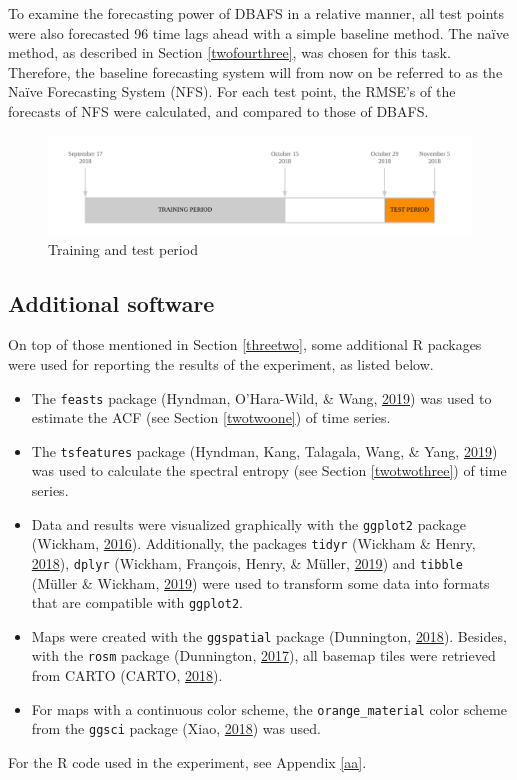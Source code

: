 \documentclass[12pt,oneside]{reedthesis}
\providecommand{\tightlist}{%
  \setlength{\itemsep}{0pt}\setlength{\parskip}{0pt}}
\begin{document}
To examine the forecasting power of DBAFS in a relative manner, all test
points were also forecasted 96 time lags ahead with a simple baseline
method. The naïve method, as described in Section \ref{twofourthree},
was chosen for this task. Therefore, the baseline forecasting system
will from now on be referred to as the Naïve Forecasting System (NFS).
For each test point, the RMSE's of the forecasts of NFS were calculated,
and compared to those of DBAFS.
\begin{figure}[h]
\includegraphics[width=\textwidth]{Figures/traintest} \caption{Training and test period}\label{fig:traintest}
\end{figure}
\subsection{Additional software}\label{additional-software}

On top of those mentioned in Section \ref{threetwo}, some additional R
packages were used for reporting the results of the experiment, as
listed below.
\begin{itemize}
\tightlist
\item
  The \texttt{feasts} package (Hyndman, O'Hara-Wild, \& Wang,
  \protect\hyperlink{ref-feasts}{2019}) was used to estimate the ACF
  (see Section \ref{twotwoone}) of time series.
\item
  The \texttt{tsfeatures} package (Hyndman, Kang, Talagala, Wang, \&
  Yang, \protect\hyperlink{ref-tsfeatures}{2019}) was used to calculate
  the spectral entropy (see Section \ref{twotwothree}) of time series.
\item
  Data and results were visualized graphically with the \texttt{ggplot2}
  package (Wickham, \protect\hyperlink{ref-ggplot}{2016}). Additionally,
  the packages \texttt{tidyr} (Wickham \& Henry,
  \protect\hyperlink{ref-tidyr}{2018}), \texttt{dplyr} (Wickham,
  François, Henry, \& Müller, \protect\hyperlink{ref-dplyr}{2019}) and
  \texttt{tibble} (Müller \& Wickham,
  \protect\hyperlink{ref-tibble}{2019}) were used to transform some data
  into formats that are compatible with \texttt{ggplot2}.
\item
  Maps were created with the \texttt{ggspatial} package (Dunnington,
  \protect\hyperlink{ref-ggspatial}{2018}). Besides, with the
  \texttt{rosm} package (Dunnington,
  \protect\hyperlink{ref-rosm}{2017}), all basemap tiles were retrieved
  from CARTO (CARTO, \protect\hyperlink{ref-carto}{2018}).
\item
  For maps with a continuous color scheme, the \texttt{orange\_material}
  color scheme from the \texttt{ggsci} package (Xiao,
  \protect\hyperlink{ref-ggsci}{2018}) was used.
\end{itemize}
For the R code used in the experiment, see Appendix \ref{aa}.
\end{document}
